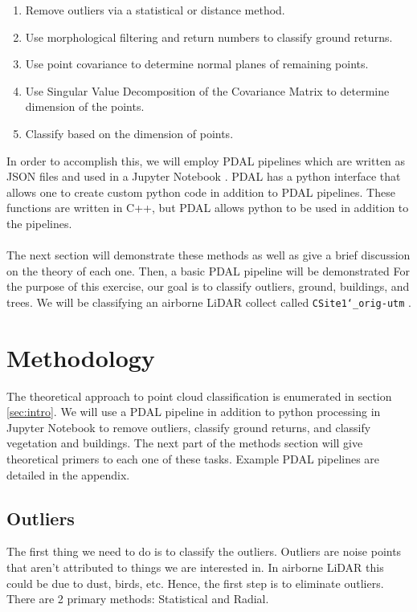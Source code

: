 \documentclass[11pt]{article}
\theoremstyle{definition}
\begin{document}
	\begin{enumerate}  
	\item Remove outliers via a statistical or distance method.
	\item Use morphological filtering and return numbers to classify ground returns.
	\item Use point covariance to determine normal planes of remaining points.
	\item Use Singular Value Decomposition of the Covariance Matrix to determine dimension of the points.
	\item Classify based on the dimension of points.
\end{enumerate}
In order to accomplish this, we will employ PDAL pipelines which are written as JSON files and used in a Jupyter Notebook  \cite{pdal}.  PDAL has a python interface that allows one to create custom python code in addition to PDAL pipelines.  These functions are written in C++, but PDAL allows python to be used in addition to the pipelines.
\\\\
The next section will demonstrate these methods as well as give a brief discussion on the theory of each one.  Then, a basic PDAL pipeline will be demonstrated  For the purpose of this exercise, our goal is to classify outliers, ground, buildings, and trees. We will be classifying an airborne LiDAR collect called \texttt{CSite1\char`_orig-utm} \cite{pdal}. 

\section{Methodology}\label{methods}
The theoretical approach to point cloud classification is enumerated in section \ref{sec:intro}.  We will use a PDAL pipeline in addition to python processing in Jupyter Notebook to remove outliers, classify ground returns, and classify vegetation and buildings.  The next part of the methods section will give theoretical primers to each one of these tasks.  Example PDAL pipelines are detailed in the appendix.  
\subsection{Outliers}\label{sub:outliers}
The first thing we need to do is to classify the outliers.  Outliers are noise points that aren't attributed to things we are interested in.  In airborne LiDAR this could be due to dust, birds, etc.  Hence, the first step is to eliminate outliers.  There are 2 primary methods: Statistical and Radial.
\end{document}
